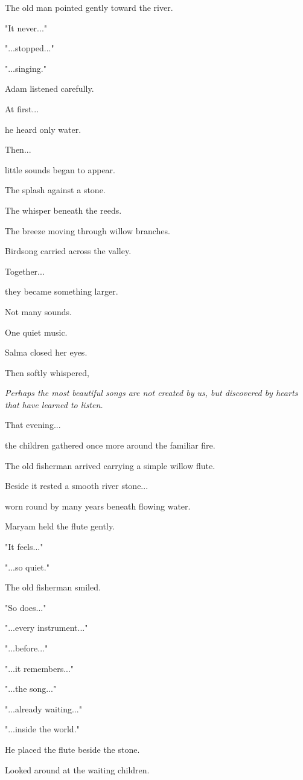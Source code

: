 \documentclass[12pt,openany]{book}
\begin{document}
The old man pointed gently toward the river.

"It never..."

"...stopped..."

"...singing."

Adam listened carefully.

At first...

he heard only water.

Then...

little sounds began to appear.

The splash against a stone.

The whisper beneath the reeds.

The breeze moving through willow branches.

Birdsong carried across the valley.

Together...

they became something larger.

Not many sounds.

One quiet music.

Salma closed her eyes.

Then softly whispered,

\emph{Perhaps the most beautiful songs are not created by us, but discovered by hearts that have learned to listen.}

That evening...

the children gathered once more around the familiar fire.

The old fisherman arrived carrying a simple willow flute.

Beside it rested a smooth river stone...

worn round by many years beneath flowing water.

Maryam held the flute gently.

"It feels..."

"...so quiet."

The old fisherman smiled.

"So does..."

"...every instrument..."

"...before..."

"...it remembers..."

"...the song..."

"...already waiting..."

"...inside the world."

He placed the flute beside the stone.

Looked around at the waiting children.
\end{document}
